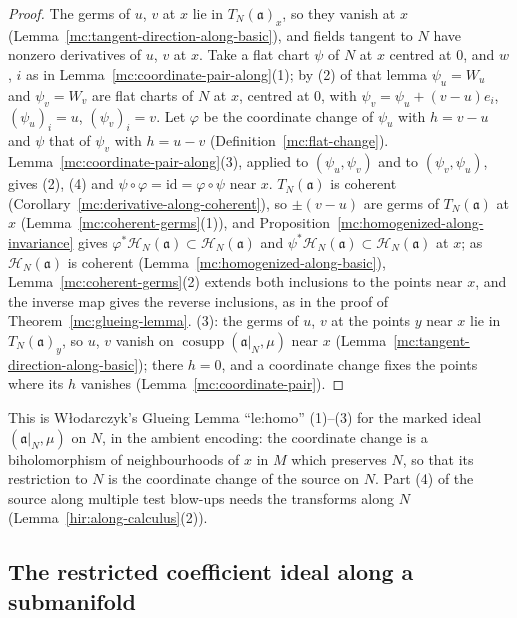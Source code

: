 \begin{proof}
\leanok
The germs of \(u\), \(v\) at \(x\) lie in \(T_N(\mathfrak a)_x\), so they vanish at \(x\) (Lemma~\ref{mc:tangent-direction-along-basic}), and fields tangent to \(N\) have nonzero
derivatives of \(u\), \(v\) at \(x\). Take a flat chart \(\psi\) of \(N\) at \(x\) centred at \(0\), and \(w\), \(i\) as in Lemma~\ref{mc:coordinate-pair-along}(1); by (2) of that lemma
\(\psi_u=W_u\) and \(\psi_v=W_v\) are flat charts of \(N\) at \(x\), centred at \(0\), with \(\psi_v=\psi_u+(v-u)e_i\), \((\psi_u)_i=u\), \((\psi_v)_i=v\). Let \(\varphi\) be the coordinate change
of \(\psi_u\) with \(h=v-u\) and \(\psi\) that of \(\psi_v\) with \(h=u-v\) (Definition~\ref{mc:flat-change}). Lemma~\ref{mc:coordinate-pair-along}(3), applied to \((\psi_u,\psi_v)\) and to
\((\psi_v,\psi_u)\), gives (2), (4) and \(\psi\circ\varphi=\mathrm{id}=\varphi\circ\psi\) near \(x\). \(T_N(\mathfrak a)\) is coherent (Corollary~\ref{mc:derivative-along-coherent}), so \(\pm(v-u)\)
are germs of \(T_N(\mathfrak a)\) at \(x\) (Lemma~\ref{mc:coherent-germs}(1)), and Proposition~\ref{mc:homogenized-along-invariance} gives \(\varphi^*\mathcal H_N(\mathfrak a)\subset\mathcal H_N(\mathfrak a)\)
and \(\psi^*\mathcal H_N(\mathfrak a)\subset\mathcal H_N(\mathfrak a)\) at \(x\); as \(\mathcal H_N(\mathfrak a)\) is coherent (Lemma~\ref{mc:homogenized-along-basic}), Lemma~\ref{mc:coherent-germs}(2) extends
both inclusions to the points near \(x\), and the inverse map gives the reverse inclusions, as in the proof of Theorem~\ref{mc:glueing-lemma}. (3): the germs of \(u\), \(v\) at the
points \(y\) near \(x\) lie in \(T_N(\mathfrak a)_y\), so \(u\), \(v\) vanish on \(\operatorname{cosupp}(\mathfrak a|_N,\mu)\) near \(x\) (Lemma~\ref{mc:tangent-direction-along-basic}); there
\(h=0\), and a coordinate change fixes the points where its \(h\) vanishes (Lemma~\ref{mc:coordinate-pair}).
\end{proof}
This is Włodarczyk's Glueing Lemma ``le:homo'' (1)--(3) for the marked ideal \((\mathfrak a|_N,\mu)\) on \(N\), in the ambient encoding: the coordinate change is a
biholomorphism of neighbourhoods of \(x\) in \(M\) which preserves \(N\), so that its restriction to \(N\) is the coordinate change of the source on \(N\). Part (4) of the source
along multiple test blow-ups needs the transforms along \(N\) (Lemma~\ref{hir:along-calculus}(2)).

\subsection{The restricted coefficient ideal along a submanifold}

